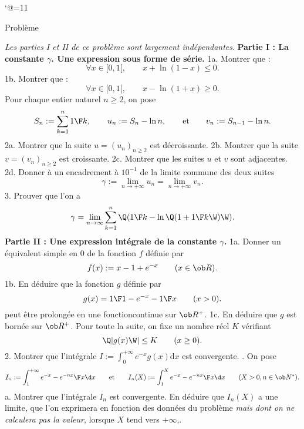 \catcode`@=11\relax



\def\LD@Maths@Exercice@Display{\ignorespaces\LD@Exo@@Exo}%


\vglue-10mm%
\bigskip
\bigskip
\vfill


\centerline{\seventeenbf Probl\`eme}
\medskip

\noindent 
{\it Les parties I et II de ce probl\`eme  sont largement ind\'ependantes}.
\medskip
\noindent
{\bf Partie I : La constante $\gamma$. Une expression sous forme de s\'erie.}
\medskip
\noindent 
1a.  Montrer que : 
$$
\forall x \in [0,1[,\qquad  x + \ln (1-x) \le 0.
$$
1b. Montrer que : 
$$
\forall x \in [0,1[, \qquad  x - \ln (1+x) \ge 0.
$$
Pour chaque entier naturel $n \ge 2$, on pose
$$
S_n:=\sum_{k=1}^n{1\F k}, \qquad 
u_n:=S_n-\ln n, \qquad \mbox{et}\qquad 
v_n:=S_{n-1}-\ln n.
$$
2a. Montrer que la suite $u=(u_n)_{n \ge 2}$ est d\'ecroissante.
\smallskip
\noindent
2b. Montrer que la suite $v=(v_n)_{n \ge 2}$ est croissante.
\smallskip
\noindent
2c. Montrer que les suites $u$ et $v$ sont adjacentes. 
\smallskip
\noindent
2d. Donner \`a un encadrement \`a $10^{-1}$ de la limite commune des deux suites 
$$
\gamma:=\lim_{n\to+\infty}u_n=\lim_{n\to+\infty}v_n.
$$ 
3. Prouver que l'on a  
$$
\gamma=\lim_{n\to\infty}\sum_{k=1}^n \Q({1\F k}-\ln\Q(1+ {1\F k} \W)\W).
$$  
{\bf Partie II : Une expression int\'egrale de la
constante $\gamma$.  }
\medskip
\noindent
1a. Donner un \'equivalent simple en $0$ de la fonction $f$ d\'efinie par 
$$
f(x):=x-1+e^{-x}\qquad(x\in\ob R).
$$
1b.  En d\'eduire que  la fonction $g$ d\'efinie par 
$$
g(x)={1\F1-e^{-x}}-{1\F x}\qquad(x>0).
$$
peut \^etre prolong\'ee en une fonctioncontinue sur $\ob R^+$. 
\smallskip
\noindent
1c.  En d\'eduire que $g$ est born\'ee sur $\ob R^+$. \pn
Pour toute la suite, on fixe un nombre r\'eel $K$ v\'erifiant  
$$
\Q|g(x)\W| \le K\qquad(x\ge0).
$$
2. Montrer que l'int\'egrale $\displaystyle I:=\int_0^{+\infty}e^{-x}g(x)\mbox{d}x$  est convergente.
\smallskip
{}.  On pose  
$$
I_n:=\int_1^{+\infty}{e^{-x}-e^{-nx}\F x}\d x\qquad \mbox{et}\qquad
I_n(X):=\int_1^X{e^{-x}-e^{-nx}\F x}\d x\qquad(X>0,n\in\ob N^*).
$$
a. Montrer que l'int\'egrale $I_n$ est convergente. 
En d\'eduire que $ I_n(X)$ a une limite, que l'on exprimera en fonction des donn\'ees du probl\`eme {\it mais dont on ne calculera pas la valeur}, lorsque $X$ tend vers $+\infty$,. 
